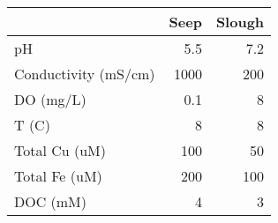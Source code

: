 \begin{tabular}{lrr}
\hline
                      &   Seep &   Slough \\
\hline
 pH                   &    5.5 &      7.2 \\
 Conductivity (mS/cm) & 1000   &    200   \\
 DO (mg/L)            &    0.1 &      8   \\
 T (C)                &    8   &      8   \\
 Total Cu (uM)        &  100   &     50   \\
 Total Fe (uM)        &  200   &    100   \\
 DOC (mM)             &    4   &      3   \\
\hline
\end{tabular}